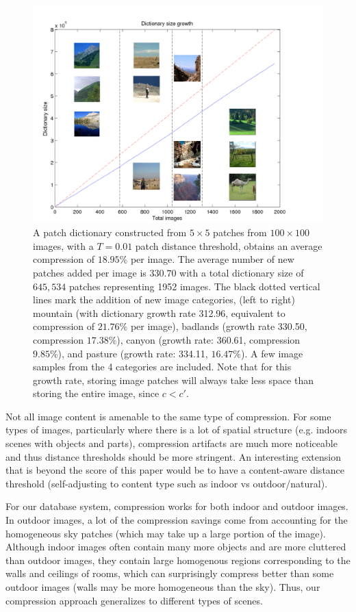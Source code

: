  \begin{figure}
\hspace{-5mm}
\includegraphics[width=1.3\linewidth]{Figures/multiscenes.pdf}
\caption{A patch dictionary constructed from $5\times 5$ patches from $100\times 100$ images, with a $T=0.01$ patch distance threshold, obtains an average compression of $18.95\%$ per image. The average number of new patches added per image is $330.70$ with a total dictionary size of $645,534$ patches representing 1952 images. The black dotted vertical lines mark the addition of new image categories, (left to right) mountain (with dictionary growth rate 312.96, equivalent to compression of $21.76\%$ per image), badlands (growth rate 330.50, compression $17.38\%$), canyon (growth rate: 360.61, compression $9.85\%$), and pasture (growth rate: 334.11, $16.47\%$). A few image samples from the 4 categories are included.  Note that for this growth rate, storing image patches will always take less space than storing the entire image, since $c < c'$.}
\label{fig:bigsize}
\end{figure}

Not all image content is amenable to the same type of compression. For some types of images, particularly where there is a lot of spatial structure (e.g. indoors scenes with objects and parts), compression artifacts are much more noticeable and thus distance thresholds should be more stringent. An interesting extension that is beyond the score of this paper would be to have a content-aware distance threshold (self-adjusting to content type such as indoor vs outdoor/natural).

For our database system, compression works for both indoor and outdoor images. In outdoor images, a lot of the compression savings come from accounting for the homogeneous sky patches (which may take up a large portion of the image). Although indoor images often contain many more objects and are more cluttered than outdoor images, they contain large homogenous regions corresponding to the walls and ceilings of rooms, which can surprisingly compress better than some outdoor images (walls may be more homogeneous than the sky). Thus, our compression approach generalizes to different types of scenes.
